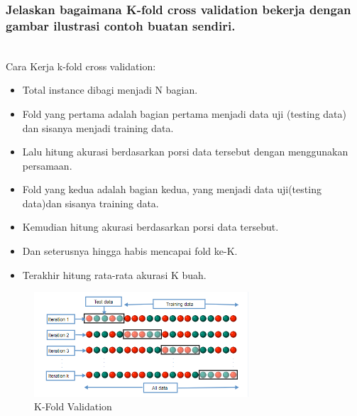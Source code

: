 \subsubsection{Jelaskan bagaimana K-fold cross validation bekerja dengan gambar ilustrasi contoh buatan sendiri.}
\hfill\\
Cara Kerja k-fold cross validation:
\begin{itemize}
	\item Total instance dibagi menjadi N bagian.
	\item Fold yang pertama adalah bagian pertama menjadi data uji (testing data) dan sisanya menjadi training data.
	\item Lalu hitung akurasi berdasarkan porsi data tersebut dengan menggunakan persamaan.
	\item Fold yang kedua adalah bagian kedua, yang menjadi data uji(testing data)dan sisanya training  data.
	\item Kemudian hitung akurasi berdasarkan porsi data tersebut.
	\item Dan seterusnya hingga habis mencapai fold ke-K.
	\item Terakhir hitung rata-rata akurasi K buah.
\end{itemize}
\begin{figure}[H]
    \includegraphics[width=8cm]{figures/1174077/2/kf.png}
    \centering
    \caption{K-Fold Validation}
\end{figure}

